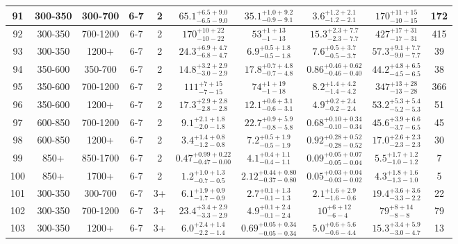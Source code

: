 \documentclass[11pt, oneside]{article}
\begin{document}
\begin{table}
{\begin{tabular}{ |c|c|c|c|c||c|c|c||c|c| }
91 & 300-350 & 300-700 & 6-7 & 2 & $65.1^{+6.5+9.0}_{-6.5-9.0}$ & $35.1^{+1.0+9.2}_{-0.9-9.1}$ & $3.6^{+1.2+2.1}_{-1.2-2.1}$ & $170^{+11+15}_{-10-15}$ & 172 \\ \hline
92 & 300-350 & 700-1200 & 6-7 & 2 & $170^{+10+22}_{-10-22}$ & $53^{+ 1+13}_{- 1-13}$ & $15.3^{+2.3+7.7}_{-2.3-7.7}$ & $427^{+17+31}_{-17-31}$ & 415 \\ \hline
93 & 300-350 & 1200+ & 6-7 & 2 & $24.3^{+6.9+4.7}_{-6.8-4.7}$ & $6.9^{+0.5+1.8}_{-0.5-1.8}$ & $7.6^{+0.5+3.7}_{-0.5-3.7}$ & $57.3^{+9.1+7.7}_{-9.0-7.7}$ & 39 \\ \hline
94 & 350-600 & 350-700 & 6-7 & 2 & $14.8^{+3.2+2.9}_{-3.0-2.9}$ & $17.8^{+0.7+4.8}_{-0.7-4.8}$ & $0.86^{+0.46+0.62}_{-0.46-0.40}$ & $44.2^{+4.8+6.5}_{-4.5-6.5}$ & 38 \\ \hline
95 & 350-600 & 700-1200 & 6-7 & 2 & $111^{+ 7+15}_{- 7-15}$ & $74^{+ 1+19}_{- 1-18}$ & $8.2^{+1.4+4.2}_{-1.4-4.2}$ & $347^{+13+28}_{-13-28}$ & 366 \\ \hline
96 & 350-600 & 1200+ & 6-7 & 2 & $17.3^{+2.9+2.8}_{-2.8-2.8}$ & $12.1^{+0.6+3.1}_{-0.6-3.1}$ & $4.9^{+0.2+2.4}_{-0.2-2.4}$ & $53.2^{+5.3+5.4}_{-5.2-5.3}$ & 51 \\ \hline
97 & 600-850 & 700-1200 & 6-7 & 2 & $9.1^{+2.1+1.8}_{-2.0-1.8}$ & $22.7^{+0.9+5.9}_{-0.8-5.8}$ & $0.68^{+0.10+0.34}_{-0.10-0.34}$ & $45.6^{+3.9+6.6}_{-3.7-6.5}$ & 45 \\ \hline
98 & 600-850 & 1200+ & 6-7 & 2 & $3.4^{+1.4+0.8}_{-1.2-0.8}$ & $7.2^{+0.5+1.9}_{-0.5-1.9}$ & $0.92^{+0.28+0.52}_{-0.28-0.52}$ & $17.0^{+2.6+2.3}_{-2.3-2.3}$ & 30 \\ \hline
99 & 850+ & 850-1700 & 6-7 & 2 & $0.47^{+0.99+0.22}_{-0.47-0.00}$ & $4.1^{+0.4+1.1}_{-0.4-1.1}$ & $0.09^{+0.05+0.07}_{-0.05-0.04}$ & $5.5^{+1.7+1.2}_{-1.0-1.2}$ & 7 \\ \hline
100 & 850+ & 1700+ & 6-7 & 2 & $1.2^{+1.0+1.3}_{-0.7-0.5}$ & $2.12^{+0.44+0.80}_{-0.37-0.80}$ & $0.05^{+0.03+0.04}_{-0.03-0.02}$ & $4.3^{+1.8+1.6}_{-1.3-1.0}$ & 5 \\ \hline
101 & 300-350 & 300-700 & 6-7 & 3+ & $6.1^{+1.9+0.9}_{-1.7-0.9}$ & $2.7^{+0.1+1.3}_{-0.1-1.3}$ & $2.1^{+1.6+2.9}_{-1.6-0.6}$ & $19.4^{+3.6+3.6}_{-3.3-2.2}$ & 22 \\ \hline
102 & 300-350 & 700-1200 & 6-7 & 3+ & $23.4^{+3.4+2.9}_{-3.3-2.9}$ & $4.9^{+0.1+2.4}_{-0.1-2.4}$ & $10^{+ 6+12}_{- 6- 4}$ & $79^{+ 8+14}_{- 8- 8}$ & 79 \\ \hline
103 & 300-350 & 1200+ & 6-7 & 3+ & $6.0^{+2.4+1.4}_{-2.2-1.4}$ & $0.69^{+0.05+0.34}_{-0.05-0.34}$ & $5.0^{+0.6+5.6}_{-0.6-4.4}$ & $15.3^{+3.4+5.9}_{-3.0-4.7}$ & 13 \\ \hline

\end{tabular}}
\end{table}
\end{document}
